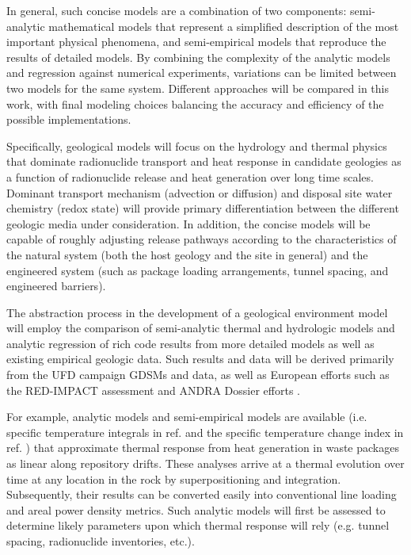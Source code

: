 In general, such concise models are a combination of two components: 
semi-analytic mathematical models that represent a simplified description of the 
most important physical phenomena, and semi-empirical models that reproduce the 
results of detailed models.  By combining the complexity of the analytic models 
and regression against numerical experiments, variations can be limited between 
two models for the same system.  Different approaches will be compared in this 
work, with final modeling choices balancing the accuracy and efficiency of the 
possible implementations.  


Specifically, geological models will focus on the hydrology and thermal 
physics that dominate radionuclide transport and heat response in candidate 
geologies as a function of radionuclide release and heat generation over long 
time scales. Dominant transport mechanism (advection or 
diffusion) and disposal site water chemistry (redox state) will provide primary 
differentiation between the different geologic media under consideration. In 
addition, the concise models will be capable of roughly adjusting release 
pathways according to the characteristics of the natural system (both the host 
geology and the site in general) and the engineered system (such as package 
loading arrangements, tunnel spacing, and engineered barriers).


The abstraction process in the development of a geological environment model 
will employ the comparison of semi-analytic thermal and hydrologic models and 
analytic regression of rich code results from more detailed models as well as 
existing empirical geologic data. Such results and data will be derived 
primarily from the \gls{UFD} campaign \glspl{GDSM} and data, as well as European 
efforts such as the RED-IMPACT assessment and \gls{ANDRA} Dossier efforts 
\cite{von_lensa_red-impact_2008, andra_argile:_2005, clayton_generic_2011} . 


For example, analytic models and semi-empirical models are available (i.e.  
specific temperature integrals in ref. \cite{li_methodology_2006} and the 
specific temperature change index in ref. \cite{radel_effect_2007}) that 
approximate thermal response from heat generation in waste packages as linear
along repository drifts. These analyses arrive at a thermal evolution over time 
at any location in the rock by superpositioning and integration. Subsequently, 
their results can be converted easily into conventional line loading and areal 
power density metrics.  Such analytic models will first be assessed to determine
likely parameters upon which thermal response will rely (e.g. tunnel spacing, 
radionuclide inventories, etc.).

